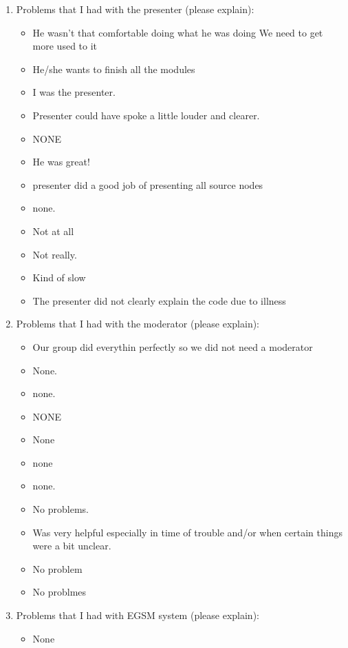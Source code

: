 \begin{enumerate}
\item Problems that I had with the presenter (please explain):

\begin{itemize}
\item He wasn't that comfortable doing what he was doing
We need to get more used to it
\item He/she wants to finish all the modules
\item I was the presenter.
\item Presenter could have spoke a little louder and clearer.

\item NONE
\item He was great!
\item presenter did a good job of presenting all source nodes
\item none.
\item Not at all
\item Not really.
\item Kind of slow
\item The presenter did not clearly explain the code due to illness
\end{itemize}

\item Problems that I had with the moderator (please explain):
\begin{itemize}
\item Our group did everythin perfectly so we did not need a
moderator

\item None.
\item none.

\item NONE
\item None
\item none

\item none.
\item No problems.
\item Was very helpful especially in time of trouble and/or when certain
things were a bit unclear.
\item No problem
\item No problmes
\end{itemize}


\item Problems that I had with EGSM system (please explain): 
\begin{itemize}
\item None


\end{itemize}
\end{enumerate}
